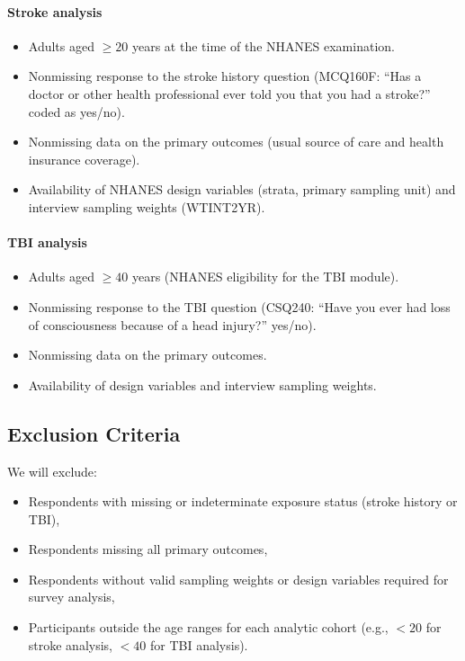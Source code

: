 \documentclass{article}
\begin{document}
\paragraph{Stroke analysis}

\begin{itemize}
    \item Adults aged $\geq 20$ years at the time of the NHANES examination.

    \item Nonmissing response to the stroke history question (MCQ160F: ``Has a doctor or other health professional ever told you that you had a stroke?'' coded as yes/no).

    \item Nonmissing data on the primary outcomes (usual source of care and health insurance coverage).

    \item Availability of NHANES design variables (strata, primary sampling unit) and interview sampling weights (WTINT2YR).

\end{itemize}

\paragraph{TBI analysis}

\begin{itemize}
    \item Adults aged $\geq 40$ years (NHANES eligibility for the TBI module).

    \item Nonmissing response to the TBI question (CSQ240: ``Have you ever had loss of consciousness because of a head injury?'' yes/no).

    \item Nonmissing data on the primary outcomes.

    \item Availability of design variables and interview sampling weights.

\end{itemize}

\subsection{Exclusion Criteria}

We will exclude:

\begin{itemize}
    \item Respondents with missing or indeterminate exposure status (stroke history or TBI),

    \item Respondents missing all primary outcomes,

    \item Respondents without valid sampling weights or design variables required for survey analysis,

    \item Participants outside the age ranges for each analytic cohort (e.g., $<20$ for stroke analysis, $<40$ for TBI analysis).

\end{itemize}
\end{document}
